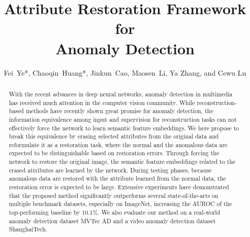 \documentclass[journal]{IEEEtran}
\begin{document}
\title{Attribute Restoration Framework for \\ Anomaly Detection}

\author{Fei~Ye*,
        Chaoqin~Huang*,
        Jinkun~Cao,
        Maosen~Li,
        Ya Zhang,
        and Cewu Lu
}



\maketitle

\let\thefootnote\relax{}

\begin{abstract}
With the recent advances in deep neural networks, anomaly detection in multimedia has received much attention in the computer vision community. 
While reconstruction-based methods have recently shown great promise for anomaly detection, the information equivalence among input and supervision for reconstruction tasks can not effectively force the network to learn semantic feature embeddings. We here propose to break this equivalence by erasing selected attributes from the original data and reformulate it as a restoration task, where the normal and the anomalous data are expected to be distinguishable based on restoration errors. 
Through forcing the network to restore the original image, the semantic feature embeddings related to the erased attributes are learned by the network. 
During testing phases, because anomalous data are restored with the attribute learned from the normal data, the restoration error is expected to be large.
Extensive experiments have demonstrated that the proposed method significantly outperforms several state-of-the-arts on multiple benchmark datasets, especially on ImageNet, increasing the AUROC of the top-performing baseline by 10.1\%. We also evaluate our method on a real-world anomaly detection dataset MVTec AD and a video anomaly detection dataset ShanghaiTech.  
\end{abstract}
\end{document}
